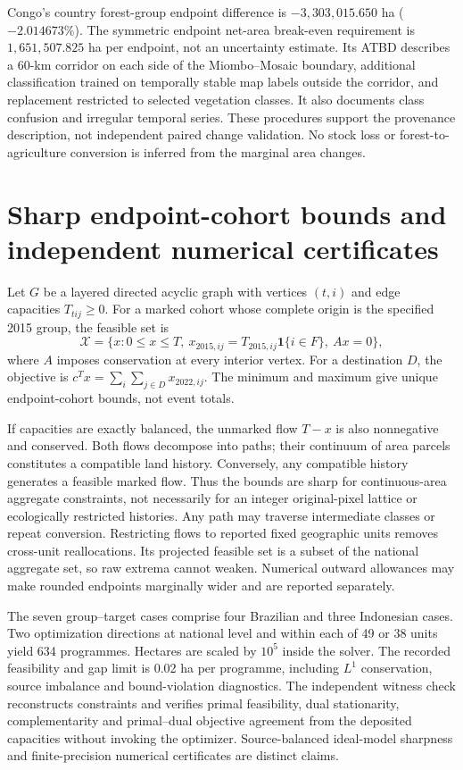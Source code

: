 Congo's country forest-group endpoint difference is $-3,303,015.650$ ha ($-2.014673\%$). The symmetric endpoint net-area break-even requirement is $1,651,507.825$ ha per endpoint, not an uncertainty estimate. Its ATBD describes a 60-km corridor on each side of the Miombo--Mosaic boundary, additional classification trained on temporally stable map labels outside the corridor, and replacement restricted to selected vegetation classes. It also documents class confusion and irregular temporal series. These procedures support the provenance description, not independent paired change validation. No stock loss or forest-to-agriculture conversion is inferred from the marginal area changes.

\section{Sharp endpoint-cohort bounds and independent numerical certificates}
Let $G$ be a layered directed acyclic graph with vertices $(t,i)$ and edge capacities $T_{tij}\ge0$. For a marked cohort whose complete origin is the specified 2015 group, the feasible set is
\[
\mathcal X=\{x:0\le x\le T,\ x_{2015,ij}=T_{2015,ij}\mathbf1\{i\in F\},\ Ax=0\},
\]
where $A$ imposes conservation at every interior vertex. For a destination $D$, the objective is $c^Tx=\sum_i\sum_{j\in D}x_{2022,ij}$. The minimum and maximum give unique endpoint-cohort bounds, not event totals.

If capacities are exactly balanced, the unmarked flow $T-x$ is also nonnegative and conserved. Both flows decompose into paths; their continuum of area parcels constitutes a compatible land history. Conversely, any compatible history generates a feasible marked flow. Thus the bounds are sharp for continuous-area aggregate constraints, not necessarily for an integer original-pixel lattice or ecologically restricted histories. Any path may traverse intermediate classes or repeat conversion. Restricting flows to reported fixed geographic units removes cross-unit reallocations. Its projected feasible set is a subset of the national aggregate set, so raw extrema cannot weaken. Numerical outward allowances may make rounded endpoints marginally wider and are reported separately.

The seven group--target cases comprise four Brazilian and three Indonesian cases. Two optimization directions at national level and within each of 49 or 38 units yield 634 programmes. Hectares are scaled by $10^5$ inside the solver. The recorded feasibility and gap limit is 0.02 ha per programme, including $L^1$ conservation, source imbalance and bound-violation diagnostics. The independent witness check reconstructs constraints and verifies primal feasibility, dual stationarity, complementarity and primal--dual objective agreement from the deposited capacities without invoking the optimizer. Source-balanced ideal-model sharpness and finite-precision numerical certificates are distinct claims.

